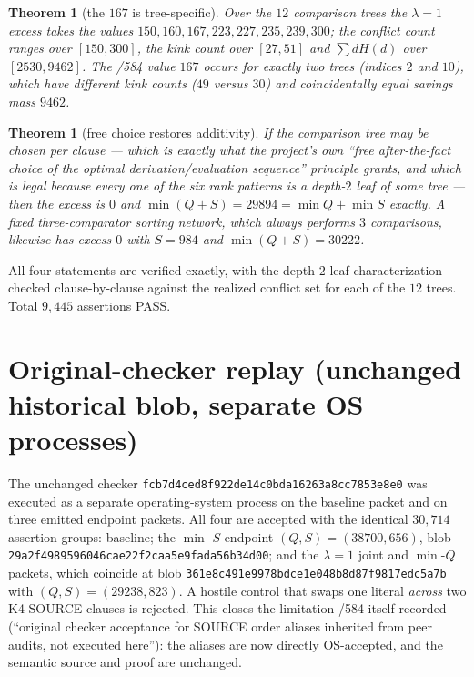 \documentclass[11pt]{article}
\newtheorem{theorem}[lemma]{Theorem}
\begin{document}
\begin{theorem}[the $167$ is tree-specific]
Over the $12$ comparison trees the $\lambda=1$ excess takes the values $150,160,167,223,227,235,239,300$; the conflict count ranges over $[150,300]$, the kink count over $[27,51]$ and $\sum dH(d)$ over $[2530,9462]$. The /584 value $167$ occurs for exactly two trees (indices $2$ and $10$), which have \emph{different} kink counts ($49$ versus $30$) and coincidentally equal savings mass $9462$.
\end{theorem}

\begin{theorem}[free choice restores additivity]
If the comparison tree may be chosen per clause --- which is exactly what the project's own ``free after-the-fact choice of the optimal derivation/evaluation sequence'' principle grants, and which is legal because every one of the six rank patterns is a depth-$2$ leaf of some tree --- then the excess is $0$ and $\min(Q+S)=29894=\min Q+\min S$ exactly. A fixed three-comparator sorting network, which always performs $3$ comparisons, likewise has excess $0$ with $S=984$ and $\min(Q+S)=30222$.
\end{theorem}

All four statements are verified exactly, with the depth-$2$ leaf characterization checked clause-by-clause against the realized conflict set for each of the $12$ trees. Total $9{,}445$ assertions PASS.

\section*{Original-checker replay (unchanged historical blob, separate OS processes)}
The unchanged checker \texttt{fcb7d4ced8f922de14c0bda16263a8cc7853e8e0} was executed as a separate operating-system process on the baseline packet and on three emitted endpoint packets. All four are accepted with the identical $30{,}714$ assertion groups: baseline; the $\min$-$S$ endpoint $(Q,S)=(38700,656)$, blob \texttt{29a2f4989596046cae22f2caa5e9fada56b34d00}; and the $\lambda=1$ joint and $\min$-$Q$ packets, which coincide at blob \texttt{361e8c491e9978bdce1e048b8d87f9817edc5a7b} with $(Q,S)=(29238,823)$. A hostile control that swaps one literal \emph{across} two K4 SOURCE clauses is rejected. This closes the limitation /584 itself recorded (``original checker acceptance for SOURCE order aliases inherited from peer audits, not executed here''): the aliases are now directly OS-accepted, and the semantic source and proof are unchanged.
\end{document}

